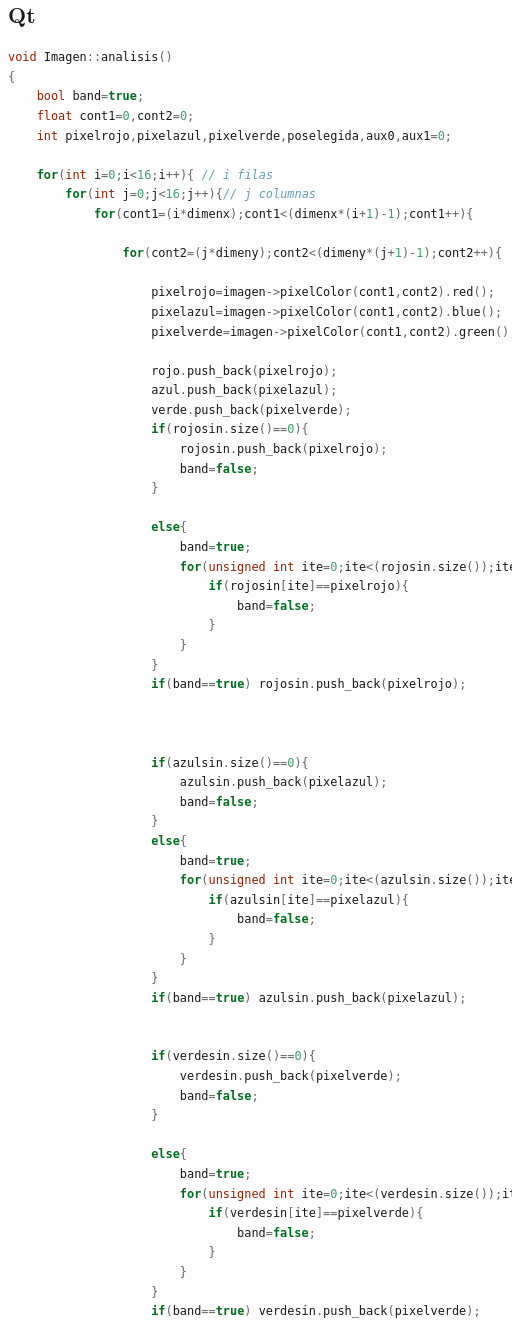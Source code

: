 \documentclass{article}
\begin{document}
\subsection{Qt}
    \begin{lstlisting}[language=C++, label=codigo_ejemplo]
    void Imagen::analisis()
{
    bool band=true;
    float cont1=0,cont2=0;
    int pixelrojo,pixelazul,pixelverde,poselegida,aux0,aux1=0;

    for(int i=0;i<16;i++){ // i filas
        for(int j=0;j<16;j++){// j columnas
            for(cont1=(i*dimenx);cont1<(dimenx*(i+1)-1);cont1++){

                for(cont2=(j*dimeny);cont2<(dimeny*(j+1)-1);cont2++){

                    pixelrojo=imagen->pixelColor(cont1,cont2).red();
                    pixelazul=imagen->pixelColor(cont1,cont2).blue();
                    pixelverde=imagen->pixelColor(cont1,cont2).green();

                    rojo.push_back(pixelrojo);
                    azul.push_back(pixelazul);
                    verde.push_back(pixelverde);
                    if(rojosin.size()==0){
                        rojosin.push_back(pixelrojo);
                        band=false;
                    }

                    else{
                        band=true;
                        for(unsigned int ite=0;ite<(rojosin.size());ite++){
                            if(rojosin[ite]==pixelrojo){
                                band=false;
                            }
                        }
                    }
                    if(band==true) rojosin.push_back(pixelrojo);



                    if(azulsin.size()==0){
                        azulsin.push_back(pixelazul);
                        band=false;
                    }
                    else{
                        band=true;
                        for(unsigned int ite=0;ite<(azulsin.size());ite++){
                            if(azulsin[ite]==pixelazul){
                                band=false;
                            }
                        }
                    }
                    if(band==true) azulsin.push_back(pixelazul);


                    if(verdesin.size()==0){
                        verdesin.push_back(pixelverde);
                        band=false;
                    }

                    else{
                        band=true;
                        for(unsigned int ite=0;ite<(verdesin.size());ite++){
                            if(verdesin[ite]==pixelverde){
                                band=false;
                            }
                        }
                    }
                    if(band==true) verdesin.push_back(pixelverde);


\end{lstlisting}
\end{document}
